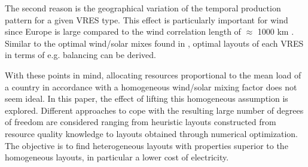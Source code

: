 \documentclass[a4paper, 5p, sort&compress]{elsarticle}%
\begin{document}



The second reason is the geographical variation of the temporal
production pattern for a given VRES type. This effect is particularly
important for wind since Europe is large compared to the wind
correlation length of $\approx$ 1000 km \cite{Widen2011}. Similar to
the optimal wind/solar mixes found in \cite{Heide2010,Heide2011},
optimal layouts of each VRES in terms of e.g. balancing can be
derived.

With these points in mind, allocating resources proportional to the
mean load of a country in accordance with a homogeneous wind/solar
mixing factor does not seem ideal. In this paper, the effect of
lifting this homogeneous assumption is explored. Different approaches
to cope with the resulting large number of degrees of freedom are
considered ranging from heuristic layouts constructed from resource
quality knowledge to layouts obtained through numerical
optimization. The objective is to find heterogeneous layouts with
properties superior to the homogeneous layouts, in particular a lower
cost of electricity.



\end{document}
